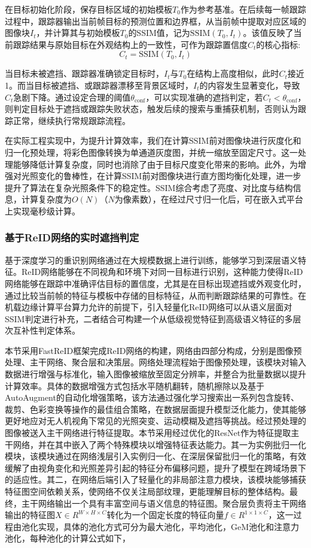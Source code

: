 在目标初始化阶段，保存目标区域的初始模板$T_0$作为参考基准。在后续每一帧跟踪过程中，跟踪器输出当前帧目标的预测位置和边界框，从当前帧中提取对应区域的图像块$I_t$，并计算其与初始模板$T_0$的SSIM值，记为$\text{SSIM}(T_0, I_t)$。该值反映了当前跟踪结果与原始目标在外观结构上的一致性，可作为跟踪置信度$C_t$的核心指标:
\begin{equation}
C_t = \text{SSIM}(T_0, I_t)
\end{equation}

当目标未被遮挡、跟踪器准确锁定目标时，$I_t$与$T_0$在结构上高度相似，此时$C_t$接近1。而当目标被遮挡、或跟踪器漂移至背景区域时，$I_t$的内容发生显著变化，导致$C_t$急剧下降。通过设定合理的阈值$\theta_{\text{conf}}$，可以实现准确的遮挡判定，若$C_t < \theta_{\text{conf}}$，则判定目标处于遮挡或跟踪失败状态，触发后续的搜索与重捕获机制，否则认为跟踪正常，继续执行常规跟踪流程。

在实际工程实现中，为提升计算效率，我们在计算SSIM前对图像块进行灰度化和归一化预处理，将彩色图像转换为单通道灰度图，并统一缩放至固定尺寸。这一处理能够降低计算复杂度，同时也消除了由于目标尺度变化带来的影响。此外，为增强对光照变化的鲁棒性，在计算SSIM前对图像块进行直方图均衡化处理，进一步提升了算法在复杂光照条件下的稳定性。SSIM综合考虑了亮度、对比度与结构信息，计算复杂度为$O(N)$（$N$为像素数），在经过尺寸归一化后，可在嵌入式平台上实现毫秒级计算。

\subsubsection{基于ReID网络的实时遮挡判定}
基于深度学习的重识别网络通过在大规模数据上进行训练，能够学习到深层语义特征。ReID网络能够在不同视角和环境下对同一目标进行识别，这种能力使得ReID网络能够在跟踪中准确评估目标的置信度，尤其是在目标出现遮挡或外观变化时，通过比较当前帧的特征与模板中存储的目标特征，从而判断跟踪结果的可靠性。在机载边缘计算平台算力允许的前提下，引入轻量化ReID网络可以从语义层面对SSIM判定进行补充，二者结合可构建一个从低级视觉特征到高级语义特征的多层次互补性判定体系。

本节采用FastReID框架完成ReID网络的构建，网络由四部分构成，分别是图像预处理、主干网络、聚合层和决策层。网络处理流程始于图像预处理，该模块对输入数据进行增强与标准化，输入图像被缩放至固定分辨率，并整合为批量数据以提升计算效率。具体的数据增强方式包括水平随机翻转，随机擦除以及基于AutoAugment的自动化增强策略，该方法通过强化学习搜索出一系列包含旋转、裁剪、色彩变换等操作的最佳组合策略，在数据层面提升模型泛化能力，使其能够更好地应对无人机视角下常见的光照突变、运动模糊及遮挡等挑战。经过预处理的图像被送入主干网络进行特征提取。本节采用经过优化的ResNet作为特征提取主干网络，并在其中嵌入了两个特殊模块以增强特征表达能力。其一为实例批归一化模块，该模块通过在网络浅层引入实例归一化、在深层保留批归一化的策略，有效缓解了由视角变化和光照差异引起的特征分布偏移问题，提升了模型在跨域场景下的适应性。其二，在网络后端引入了轻量化的非局部注意力模块，该模块能够捕获特征图空间依赖关系，使网络不仅关注局部纹理，更能理解目标的整体结构。最终，主干网络输出一个具有丰富空间与语义信息的特征图。聚合层负责将主干网络输出的特征图$X\in R^{W\times H\times C} $转化为一个固定长度的特征向量$f\in R^{1\times 1\times C}$，这一过程由池化实现，具体的池化方式可分为最大池化，平均池化，GeM池化和注意力池化，每种池化的计算公式如下，

